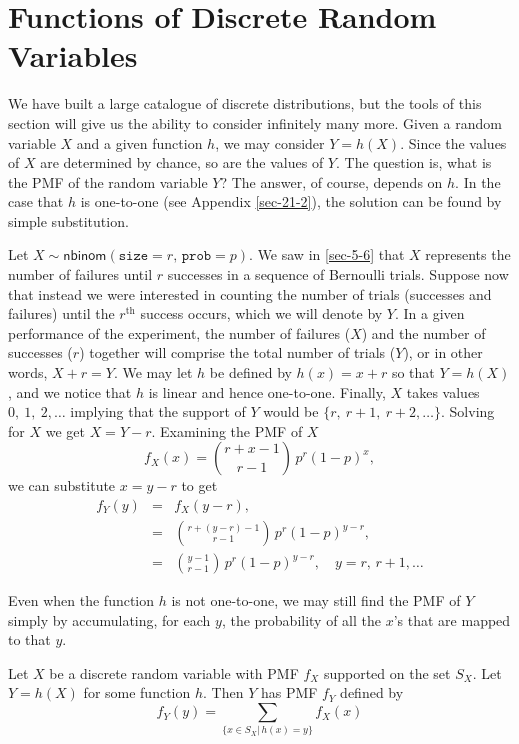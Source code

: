 \documentclass[captions=tableheading]{scrbook}
\begin{document}
\section{Functions of Discrete Random Variables}
\label{sec-5-7}
\label{sec-functions-discrete-rvs}


We have built a large catalogue of discrete distributions, but the tools of this section will give us the ability to consider infinitely many more. Given a random variable \(X\) and a given function \(h\), we may consider \(Y=h(X)\). Since the values of \(X\) are determined by chance, so are the values of \(Y\). The question is, what is the PMF of the random variable \(Y\)? The answer, of course, depends on \(h\). In the case that \(h\) is one-to-one (see Appendix \ref{sec-21-2}), the solution can be found by simple substitution.

\begin{example}
Let \(X\sim\mathsf{nbinom}(\mathtt{size}=r,\,\mathtt{prob}=p)\). We saw in \ref{sec-5-6} that \(X\) represents the number of failures until \(r\) successes in a sequence of Bernoulli trials. Suppose now that instead we were interested in counting the number of trials (successes and failures) until the \(r^{\mathrm{th}}\) success occurs, which we will denote by \(Y\). In a given performance of the experiment, the number of failures (\(X\)) and the number of successes (\(r\)) together will comprise the total number of trials (\(Y\)), or in other words, \(X+r=Y\). We may let \(h\) be defined by \(h(x)=x+r\) so that \(Y=h(X)\), and we notice that \(h\) is linear and hence one-to-one. Finally, \(X\) takes values \(0,\ 1,\ 2,\ldots\) implying that the support of \(Y\) would be \(\{ r,\ r+1,\ r+2,\ldots \}\). Solving for \(X\) we get \(X=Y-r\). Examining the PMF of \(X\)
\begin{equation}
f_{X}(x)={r+x-1 \choose r-1}\, p^{r}(1-p)^{x},
\end{equation}
we can substitute \( x = y - r \) to get
\begin{eqnarray*}
f_{Y}(y) & = & f_{X}(y-r),\\
 & = & {r+(y-r)-1 \choose r-1}\, p^{r}(1-p)^{y-r},\\
 & = & {y-1 \choose r-1}\, p^{r}(1-p)^{y-r},\quad y=r,\, r+1,\ldots
\end{eqnarray*}
\end{example}


Even when the function \(h\) is not one-to-one, we may still find the PMF of \(Y\) simply by accumulating, for each \(y\), the probability of all the \(x\)'s that are mapped to that \(y\).
\begin{prop}
Let \(X\) be a discrete random variable with PMF \(f_{X}\) supported on the set \(S_{X}\). Let \(Y=h(X)\) for some function \(h\). Then \(Y\) has PMF \(f_{Y}\) defined by
\begin{equation}
f_{Y}(y)=\sum_{\{x\in S_{X}|\, h(x)=y\}}f_{X}(x)
\end{equation}
\end{prop}
\end{document}
